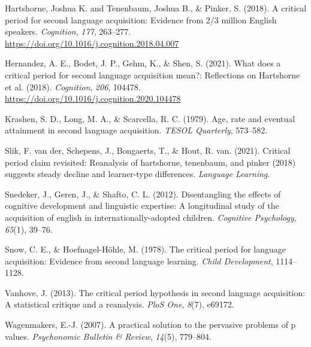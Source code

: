 \documentclass[
  english,
  doc,floatsintext]{apa6}
\newlength{\cslhangindent}
\newlength{\cslentryspacingunit} %
\newenvironment{CSLReferences}[2] %
 {%
  \setlength{\parindent}{0pt}
  \ifodd #1
  \let\oldpar\par
  \def\par{\hangindent=\cslhangindent\oldpar}
  \fi
  \setlength{\parskip}{#2\cslentryspacingunit}
 }%
 {}
\begin{document}
\begin{CSLReferences}{1}{0}
\leavevmode{}%
Hartshorne, Joshua K. and Tenenbaum, Joshua B., \& Pinker, S. (2018). A critical period for second language acquisition: Evidence from 2/3 million English speakers. \emph{Cognition}, \emph{177}, 263--277. \url{https://doi.org/10.1016/j.cognition.2018.04.007}

\leavevmode{}%
Hernandez, A. E., Bodet, J. P., Gehm, K., \& Shen, S. (2021). What does a critical period for second language acquisition mean?: Reflections on Hartshorne et al. (2018). \emph{Cognition}, \emph{206}, 104478. \url{https://doi.org/10.1016/j.cognition.2020.104478}

\leavevmode{}%
Krashen, S. D., Long, M. A., \& Scarcella, R. C. (1979). Age, rate and eventual attainment in second language acquisition. \emph{TESOL Quarterly}, 573--582.

\leavevmode{}%
Slik, F. van der, Schepens, J., Bongaerts, T., \& Hout, R. van. (2021). Critical period claim revisited: Reanalysis of hartshorne, tenenbaum, and pinker (2018) suggests steady decline and learner-type differences. \emph{Language Learning}.

\leavevmode{}%
Snedeker, J., Geren, J., \& Shafto, C. L. (2012). Disentangling the effects of cognitive development and linguistic expertise: A longitudinal study of the acquisition of english in internationally-adopted children. \emph{Cognitive Psychology}, \emph{65}(1), 39--76.

\leavevmode{}%
Snow, C. E., \& Hoefnagel-Höhle, M. (1978). The critical period for language acquisition: Evidence from second language learning. \emph{Child Development}, 1114--1128.

\leavevmode{}%
Vanhove, J. (2013). The critical period hypothesis in second language acquisition: A statistical critique and a reanalysis. \emph{PloS One}, \emph{8}(7), e69172.

\leavevmode{}%
Wagenmakers, E.-J. (2007). A practical solution to the pervasive problems of p values. \emph{Psychonomic Bulletin \& Review}, \emph{14}(5), 779--804.

\end{CSLReferences}
\end{document}
